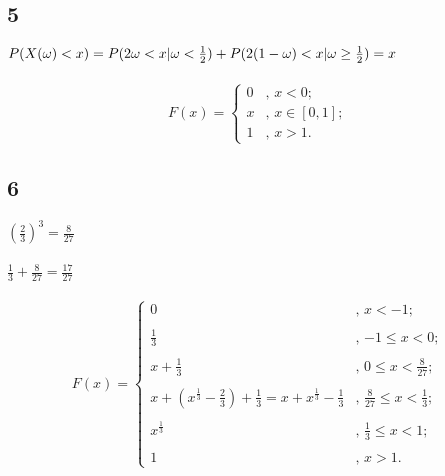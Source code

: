 \documentclass[a4paper]{article}
\begin{document}
\begin{large}
		\subsection*{5}
		$P(X(\omega)<x)=P(2\omega<x|\omega < \frac{1}{2})+P(2(1-\omega)<x|\omega \ge \frac{1}{2})\\
		=x$\\
		\\
		\[ F(x) = \left\{ \begin{array}{ll}
			0 & \mbox{, $x<0$};\\
			x & \mbox{, $x \in [0,1]$};\\
			1 & \mbox{, $x>1$}.\end{array} \right. \]
		\subsection*{6}
		$(\frac{2}{3})^3=\frac{8}{27}$\\
		\\
		$\frac{1}{3}+\frac{8}{27}=\frac{17}{27}$\\
		\\
		\[ F(x) = \left\{ \begin{array}{ll}
			0 & \mbox{, $x<-1$};\\
			\\
			\frac{1}{3} & \mbox{, $-1 \le x < 0$};\\
			\\
			x+\frac{1}{3} & \mbox{, $0 \le x < \frac{8}{27}$};\\
			\\
			x+(x^{\frac{1}{3}}-\frac{2}{3})+\frac{1}{3}=x+x^{\frac{1}{3}}-\frac{1}{3} & \mbox{, $\frac{8}{27} \le x < \frac{1}{3}$};\\
			\\
			x^{\frac{1}{3}} & \mbox{, $\frac{1}{3} \le x < 1$};\\
			\\
			1 & \mbox{, $x>1$}.\end{array} \right. \]
	\end{large}
\end{document}
